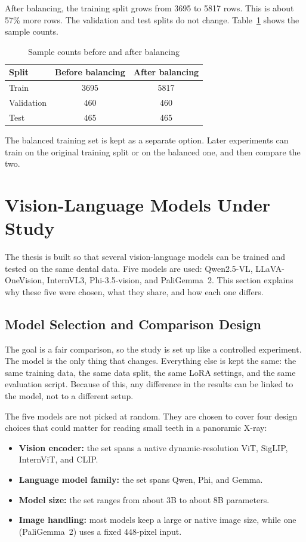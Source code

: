 \documentclass[a4paper,12pt]{report}
\begin{document}
After balancing, the training split grows from 3695 to 5817 rows. This is about 57\% more rows. The validation and test splits do not change. Table~\ref{tab:balance-rows} shows the sample counts.

\begin{table}[H]
\centering
\caption{Sample counts before and after balancing}
\label{tab:balance-rows}
\begin{tabular}{lcc}
\toprule
Split & Before balancing & After balancing \\
\midrule
Train & 3695 & 5817 \\
Validation & 460 & 460 \\
Test & 465 & 465 \\
\bottomrule
\end{tabular}
\end{table}

The balanced training set is kept as a separate option. Later experiments can train on the original training split or on the balanced one, and then compare the two.


\section{Vision-Language Models Under Study}

The thesis is built so that several vision-language models can be trained and tested on the same dental data. Five models are used: Qwen2.5-VL, LLaVA-OneVision, InternVL3, Phi-3.5-vision, and PaliGemma~2. This section explains why these five were chosen, what they share, and how each one differs.

\subsection{Model Selection and Comparison Design}

The goal is a fair comparison, so the study is set up like a controlled experiment. The model is the only thing that changes. Everything else is kept the same: the same training data, the same data split, the same LoRA settings, and the same evaluation script. Because of this, any difference in the results can be linked to the model, not to a different setup.

The five models are not picked at random. They are chosen to cover four design choices that could matter for reading small teeth in a panoramic X-ray:

\begin{itemize}
    \item \textbf{Vision encoder:} the set spans a native dynamic-resolution ViT, SigLIP, InternViT, and CLIP.
    \item \textbf{Language model family:} the set spans Qwen, Phi, and Gemma.
    \item \textbf{Model size:} the set ranges from about 3B to about 8B parameters.
    \item \textbf{Image handling:} most models keep a large or native image size, while one (PaliGemma~2) uses a fixed 448-pixel input.
\end{itemize}
\end{document}
